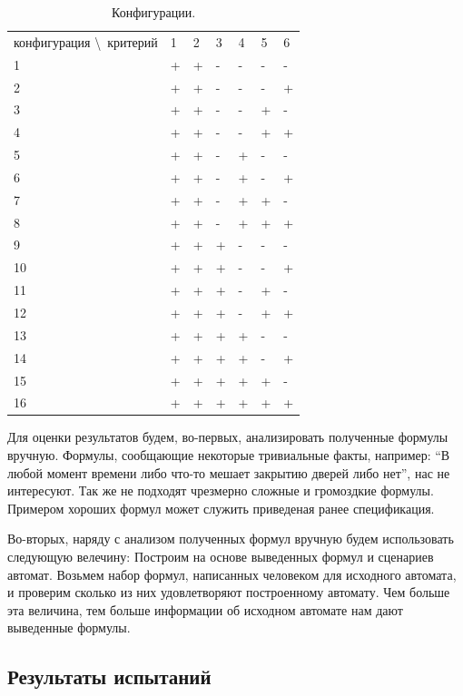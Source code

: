 \documentclass[12pt,fleqn]{article}
\begin{document}
\begin{table}
\centering
\begin{tabular}{ l | l | l | l | l | l | l }
конфигурация \textbackslash \ критерий & 1 & 2 & 3 & 4 & 5 & 6 \\
1  & + & + & - & - & - & - \\
2  & + & + & - & - & - & + \\
3  & + & + & - & - & + & - \\
4  & + & + & - & - & + & + \\
5  & + & + & - & + & - & - \\
6  & + & + & - & + & - & + \\
7  & + & + & - & + & + & - \\
8  & + & + & - & + & + & + \\
9  & + & + & + & - & - & - \\
10 & + & + & + & - & - & + \\
11 & + & + & + & - & + & - \\
12 & + & + & + & - & + & + \\
13 & + & + & + & + & - & - \\
14 & + & + & + & + & - & + \\
15 & + & + & + & + & + & - \\
16 & + & + & + & + & + & + \\
\end{tabular}
\caption{Конфигурации.}
\end{table}

Для оценки результатов будем, во-первых, анализировать полученные формулы вручную. Формулы, сообщающие некоторые тривиальные
факты, например: ``В любой момент времени либо что-то мешает закрытию дверей либо нет'', нас не интересуют.
Так же не подходят чрезмерно сложные и громоздкие формулы. Примером хороших формул может служить приведеная ранее спецификация.

Во-вторых, наряду с анализом полученных формул вручную будем использовать следующую велечину:
Построим на основе выведенных формул и сценариев автомат. Возьмем набор формул, написанных человеком для исходного автомата, и
проверим сколько из них удовлетворяют построенному автомату. Чем больше эта величина, тем больше информации об исходном
автомате нам дают выведенные формулы.

\subsection{Результаты испытаний}
\end{document}
